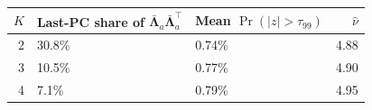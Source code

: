 
\begin{tabular}{rllr}
\toprule
$K$ & Last-PC share of $\bar{\boldsymbol\Lambda}_a\bar{\boldsymbol\Lambda}_a^\top$ & Mean $\Pr(|z|>\tau_{99})$ & $\hat\nu$\\
\midrule
2 & 30.8\% & 0.74\% & 4.88\\
3 & 10.5\% & 0.77\% & 4.90\\
4 & 7.1\% & 0.79\% & 4.95\\
\bottomrule
\end{tabular}
